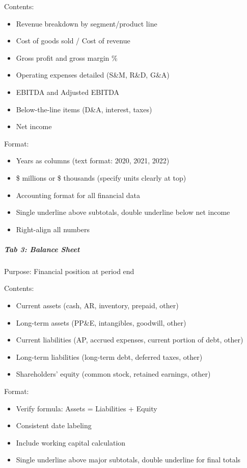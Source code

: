 \documentclass[11pt]{article}
\begin{document}
Contents:

\begin{itemize}[leftmargin=*,itemsep=2pt,topsep=2pt]
\item {} Revenue breakdown by segment/product line
\item {} Cost of goods sold / Cost of revenue
\item {} Gross profit and gross margin \%
\item {} Operating expenses detailed (S\&M, R\&D, G\&A)
\item {} EBITDA and Adjusted EBITDA
\item {} Below-the-line items (D\&A, interest, taxes)
\item {} Net income
\end{itemize}

Format:

\begin{itemize}[leftmargin=*,itemsep=2pt,topsep=2pt]
\item {} Years as columns (text format: 2020, 2021, 2022)
\item {} \$ millions or \$ thousands (specify units clearly at top)
\item {} Accounting format for all financial data
\item {} Single underline above subtotals, double underline below net income
\item {} Right-align all numbers
\end{itemize}

\subparagraph{Tab 3: Balance Sheet}\mbox{}\par
Purpose: Financial position at period end


Contents:

\begin{itemize}[leftmargin=*,itemsep=2pt,topsep=2pt]
\item {} Current assets (cash, AR, inventory, prepaid, other)
\item {} Long-term assets (PP\&E, intangibles, goodwill, other)
\item {} Current liabilities (AP, accrued expenses, current portion of debt, other)
\item {} Long-term liabilities (long-term debt, deferred taxes, other)
\item {} Shareholders' equity (common stock, retained earnings, other)
\end{itemize}

Format:

\begin{itemize}[leftmargin=*,itemsep=2pt,topsep=2pt]
\item {} Verify formula: Assets = Liabilities + Equity
\item {} Consistent date labeling
\item {} Include working capital calculation
\item {} Single underline above major subtotals, double underline for final totals
\end{itemize}
\end{document}
